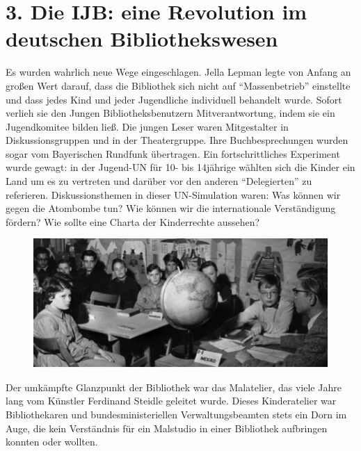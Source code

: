 \documentclass[a4paper,
fontsize=11pt,
oneside,
numbers=noperiodatend,
parskip=half-,
bibliography=totoc,
final
]{scrartcl}
\begin{document}
\section*{3. Die IJB: eine Revolution im deutschen
Bibliothekswesen}\label{die-ijb-eine-revolution-im-deutschen-bibliothekswesen}

Es wurden wahrlich neue Wege eingeschlagen. Jella Lepman legte von
Anfang an großen Wert darauf, dass die Bibliothek sich nicht auf
\enquote{Massenbetrieb} einstellte und dass jedes Kind und jeder
Jugendliche individuell behandelt wurde. Sofort verlieh sie den Jungen
Bibliotheksbenutzern Mitverantwortung, indem sie ein Jugendkomitee
bilden ließ. Die jungen Leser waren Mitgestalter in Diskussionsgruppen
und in der Theatergruppe. Ihre Buchbesprechungen wurden sogar vom
Bayerischen Rundfunk übertragen. Ein fortschrittliches Experiment wurde
gewagt: in der Jugend-UN für 10- bis 14jährige wählten sich die Kinder
ein Land um es zu vertreten und darüber vor den anderen
\enquote{Delegierten} zu referieren. Diskussionsthemen in dieser
UN-Simulation waren: Was können wir gegen die Atombombe tun? Wie können
wir die internationale Verständigung fördern? Wie sollte eine Charta der
Kinderrechte aussehen?

\begin{figure}[htbp]
\centering
\includegraphics{img/bild8c.jpg}
\end{figure}

Der umkämpfte Glanzpunkt der Bibliothek war das Malatelier, das viele
Jahre lang vom Künstler Ferdinand Steidle geleitet wurde. Dieses
Kinderatelier war Bibliothekaren und bundesministeriellen
Verwaltungsbeamten stets ein Dorn im Auge, die kein Verständnis für ein
Malstudio in einer Bibliothek aufbringen konnten oder wollten.
\end{document}

